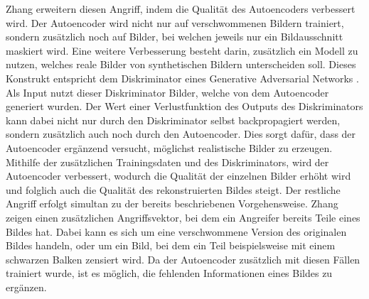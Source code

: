 Zhang \etal \cite{P-4} erweitern diesen Angriff, indem die Qualität des Autoencoders verbessert wird. 
Der Autoencoder wird nicht nur auf verschwommenen Bildern trainiert, sondern zusätzlich noch auf Bilder, bei welchen jeweils nur ein Bildausschnitt maskiert wird.
Eine weitere Verbesserung besteht darin, zusätzlich ein Modell zu nutzen, welches reale Bilder von synthetischen Bildern unterscheiden soll.
Dieses Konstrukt entspricht dem Diskriminator eines Generative Adversarial Networks \cite{P-86}.
Als Input nutzt dieser Diskriminator Bilder, welche von dem Autoencoder generiert wurden.
Der Wert einer Verlustfunktion des Outputs des Diskriminators kann dabei nicht nur durch den Diskriminator selbst backpropagiert werden, sondern zusätzlich auch noch durch den Autoencoder.
Dies sorgt dafür, dass der Autoencoder ergänzend versucht, möglichst realistische Bilder zu erzeugen.
Mithilfe der zusätzlichen Trainingsdaten und des Diskriminators, wird der Autoencoder verbessert, wodurch die Qualität der einzelnen Bilder erhöht wird und folglich auch die Qualität des rekonstruierten Bildes steigt.
Der restliche Angriff erfolgt simultan zu der bereits beschriebenen Vorgehensweise.
Zhang \etal \cite{P-4} zeigen einen zusätzlichen Angriffsvektor, bei dem ein Angreifer bereits Teile eines Bildes hat. 
Dabei kann es sich um eine verschwommene Version des originalen Bildes handeln, oder um ein Bild, bei dem ein Teil beispielsweise mit einem schwarzen Balken zensiert wird.
Da der Autoencoder zusätzlich mit diesen Fällen trainiert wurde, ist es möglich, die fehlenden Informationen eines Bildes zu ergänzen.


